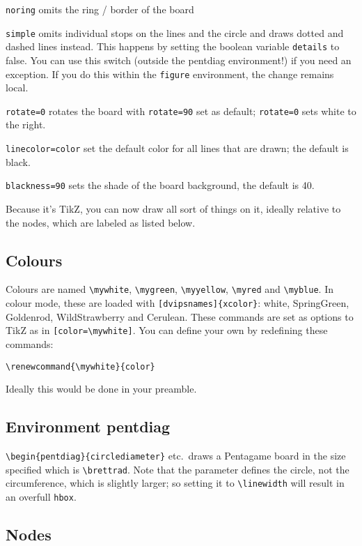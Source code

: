 \documentclass[a5paper]{scrartcl}
\begin{document}
\verb|noring|  omits the ring / border of the board

\verb|simple| omits individual stops on the lines and the circle and draws dotted and dashed lines instead. This happens by setting the boolean variable \verb|details| to false. You can use this switch (outside the pentdiag environment!) if you need an exception. If you do this within the \verb|figure| environment, the change remains local.
    
\verb|rotate=0| rotates the board with \verb|rotate=90| set as default; \verb|rotate=0| sets white to the right.
    
\verb|linecolor=color| set the default color for all lines that are drawn; the default is black. 
    
\verb|blackness=90| sets the shade of the board background, the default is 40.

Because it's TikZ, you can now draw all sort of things on it, ideally relative to the nodes, which are labeled as listed below.

\subsection*{Colours}

Colours are named \verb|\mywhite|, \verb|\mygreen|, \verb|\myyellow|, \verb|\myred| and \verb|\myblue|. In colour mode, these are loaded with \verb|[dvipsnames]{xcolor}|: white, SpringGreen, Goldenrod, WildStrawberry and Cerulean. These commands are set as options to TikZ as in \verb|[color=\mywhite]|. You can define your own by redefining these commands:

\verb|\renewcommand{\mywhite}{color}|

Ideally this would be done in your preamble.


\subsection*{Environment pentdiag}

\verb|\begin{pentdiag}{circlediameter}| etc.~draws a Pentagame board in the size specified which is \verb|\brettrad|. Note that the parameter defines the circle, not the circumference, which is slightly larger; so setting it to \verb|\linewidth| will result in an overfull \verb|hbox|.

\subsection*{Nodes}
\end{document}
